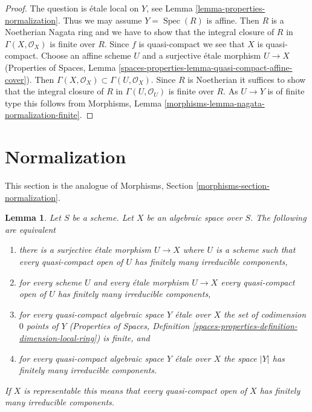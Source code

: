 \documentclass{stacks-project}
\theoremstyle{plain}
\newtheorem{lemma}[subsection]{Lemma}
\theoremstyle{definition}
\theoremstyle{remark}
\numberwithin{equation}{subsection}
\def\Spec{\mathop{\mathrm{Spec}}}
\begin{document}
\begin{proof}
The question is \'etale local on $Y$, see
Lemma \ref{lemma-properties-normalization}.
Thus we may assume $Y = \Spec(R)$ is affine.
Then $R$ is a Noetherian Nagata ring
and we have to show that the integral closure of
$R$ in $\Gamma(X, \mathcal{O}_X)$ is finite over $R$.
Since $f$ is quasi-compact we see that $X$ is quasi-compact.
Choose an affine scheme $U$ and a surjective \'etale
morphism $U \to X$ (Properties of Spaces, Lemma
\ref{spaces-properties-lemma-quasi-compact-affine-cover}).
Then $\Gamma(X, \mathcal{O}_X) \subset \Gamma(U, \mathcal{O}_X)$.
Since $R$ is Noetherian it suffices to show that
the integral closure of $R$ in $\Gamma(U, \mathcal{O}_U)$
is finite over $R$. As $U \to Y$ is of finite type
this follows from
Morphisms, Lemma \ref{morphisms-lemma-nagata-normalization-finite}.
\end{proof}






\section{Normalization}
\label{section-normalization}

\noindent
This section is the analogue of
Morphisms, Section \ref{morphisms-section-normalization}.

\begin{lemma}
\label{lemma-prepare-normalization}
Let $S$ be a scheme. Let $X$ be an algebraic space over $S$.
The following are equivalent
\begin{enumerate}
\item there is a surjective \'etale morphism $U \to X$ where $U$
is a scheme such that every quasi-compact open of $U$ has
finitely many irreducible components,
\item for every scheme $U$ and every \'etale morphism
$U \to X$ every quasi-compact open of $U$ has finitely many
irreducible components,
\item for every quasi-compact algebraic space $Y$ \'etale over $X$
the set of codimension $0$ points of $Y$ (Properties of Spaces,
Definition \ref{spaces-properties-definition-dimension-local-ring})
is finite, and
\item for every quasi-compact algebraic space $Y$ \'etale over $X$
the space $|Y|$ has finitely many irreducible components.
\end{enumerate}
If $X$ is representable this means that every quasi-compact open of $X$
has finitely many irreducible components.
\end{lemma}
\end{document}
